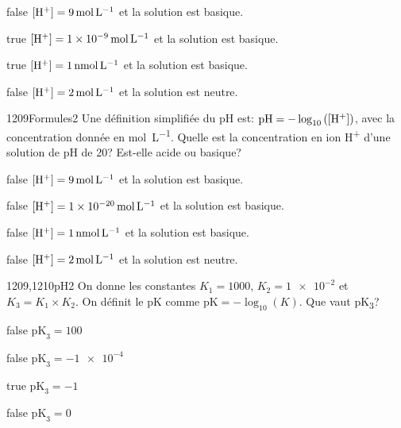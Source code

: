         \begin{reponses}
    	    \item[false] $\text{[H\textsuperscript{+}]} = \SI{9}{\mol\per\liter}$ et la solution est basique.
    	    \item[true] $\text{[H\textsuperscript{+}]} = \SI{1e-9}{\mol\per\liter}$ et la solution est basique.
    	    \item[true] $\text{[H\textsuperscript{+}]} = \SI{1}{\nano\mol\per\liter}$ et la solution est basique.
    	    \item[false] $\text{[H\textsuperscript{+}]} = \SI{2}{\mol\per\liter}$ et la solution est neutre.
        \end{reponses}
        \begin{question}{1209}{Formules}{2}{}
			Une définition simplifiée du pH est: $\text{pH} = -\log_{10}\left(\text{[H\textsuperscript{+}]}\right)$, avec la concentration donnée en \si{\mol\per\liter}. Quelle est la concentration en ion H\textsuperscript{+} d'une solution de pH de 20? Est-elle acide ou basique?
        \end{question}
        \begin{reponses}
    	    \item[false] $\text{[H\textsuperscript{+}]} = \SI{9}{\mol\per\liter}$ et la solution est basique.
    	    \item[false] $\text{[H\textsuperscript{+}]} = \SI{1e-20}{\mol\per\liter}$ et la solution est basique.
    	    \item[false] $\text{[H\textsuperscript{+}]} = \SI{1}{\nano\mol\per\liter}$ et la solution est basique.
    	    \item[false] $\text{[H\textsuperscript{+}]} = \SI{2}{\mol\per\liter}$ et la solution est neutre.
        \end{reponses}
        \begin{question}{1209,1210}{pH}{2}{}
			On donne les constantes $K_1 = 1000$, $K_2 = \num{1e-2}$ et $K_3 = K_1\times K_2$. On définit le pK comme $\text{pK} = -\log_{10}\left(K\right)$. Que vaut pK\textsubscript{3}?
        \end{question}
        \begin{reponses}
    	    \item[false] $\text{pK}_3 = 100$
    	    \item[false] $\text{pK}_3 = \num{-1e-4}$
    	    \item[true] $\text{pK}_3 = -1$
    	    \item[false] $\text{pK}_3 = 0$
        \end{reponses}
